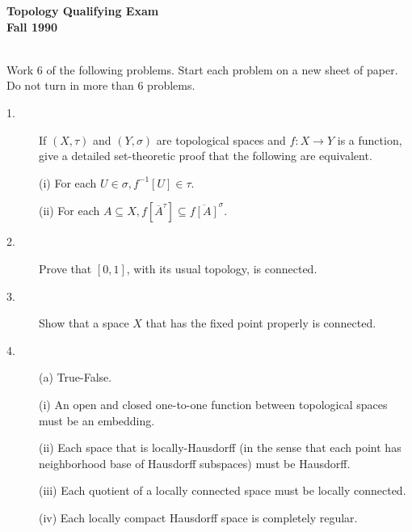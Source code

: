 \documentclass{article}
\begin{document}






\begin{center}\begin{LARGE}
{\bf Topology Qualifying Exam}\\ 
{\bf Fall 1990}\\ \end{LARGE}
\end{center}
\vspace{0.1in}
\noindent\hrulefill\\

Work 6 of the following problems. Start each problem on a new sheet of
paper. Do not turn in more than 6 problems.

\begin{description}
\item[1.]
If $(X,\tau)$ and $(Y, \sigma)$ are topological spaces and $f: X \to Y$ is
a function, give a detailed set-theoretic proof that the following are
equivalent.

\item[\quad] (i)
For each $U \in \sigma, f^{-1} [U] \in \tau$.

\item[\quad] (ii)
For each $A \subseteq X, f[\overline A^\tau] \subseteq
  \overline{f[A]}^\sigma$.

\item[2.]
Prove that $[0,1]$, with its usual topology, is connected.

\item[3.]
Show that a space $X$ that has the fixed point properly is connected.

\item[4.] (a)
True-False.

\item[\qquad] (i)
An open and closed one-to-one function between topological spaces must be an
embedding.

\item[\qquad] (ii)
Each space that is locally-Hausdorff (in the sense that each point has
neighborhood base of Hausdorff subspaces) must be Hausdorff.

\item[\qquad] (iii)
Each quotient of a locally connected space must be locally connected.

\item[\qquad] (iv)
Each locally compact Hausdorff space is completely regular.


\end{description}
\end{document}
